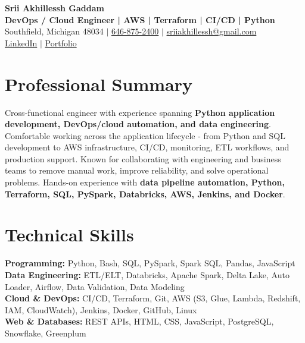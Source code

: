 \documentclass[letterpaper,10pt]{article}
\begin{document}
\fontsize{9.35pt}{10.45pt}\selectfont

\begin{center}
    {\LARGE \textbf{Srii Akhillessh Gaddam}} \\[-1pt]
    \textbf{DevOps / Cloud Engineer | AWS | Terraform | CI/CD | Python} \\[2pt]
    Southfield, Michigan 48034 $|$
    \href{tel:6468752400}{646-875-2400} $|$
    \href{mailto:sriiakhillessh@gmail.com}{sriiakhillessh@gmail.com} \\[1pt]
    \href{https://www.linkedin.com/in/srii-akhiilessh-gaddam-b48668191/}{LinkedIn} $|$
    \href{https://sriiakhillesshg.github.io/portfolio/}{Portfolio}
\end{center}
\vspace{-8pt}

\section{Professional Summary}
\small{Cross-functional engineer with experience spanning \textbf{Python application development, DevOps/cloud automation, and data engineering}. Comfortable working across the application lifecycle - from Python and SQL development to AWS infrastructure, CI/CD, monitoring, ETL workflows, and production support. Known for collaborating with engineering and business teams to remove manual work, improve reliability, and solve operational problems. Hands-on experience with \textbf{data pipeline automation, Python, Terraform, SQL, PySpark, Databricks, AWS, Jenkins, and Docker}.}

\section{Technical Skills}
\small{
\textbf{Programming:} Python, Bash, SQL, PySpark, Spark SQL, Pandas, JavaScript \\
\textbf{Data Engineering:} ETL/ELT, Databricks, Apache Spark, Delta Lake, Auto Loader, Airflow, Data Validation, Data Modeling \\
\textbf{Cloud \& DevOps:} CI/CD, Terraform, Git, AWS (S3, Glue, Lambda, Redshift, IAM, CloudWatch), Jenkins, Docker, GitHub, Linux \\
\textbf{Web \& Databases:} REST APIs, HTML, CSS, JavaScript, PostgreSQL, Snowflake, Greenplum
}
\end{document}
